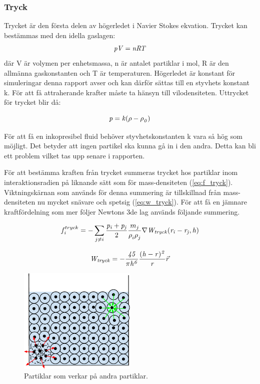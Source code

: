 \documentclass[a4paper,12pt,oneside,final]{extarticle}
\begin{document}
\subsubsection{Tryck}
Trycket är den första delen av högerledet i Navier Stokes ekvation.
Trycket kan bestämmas med den idella gaslagen:
\begin{equation}
{\it pV = nRT}
\end{equation}
där V är volymen per enhetsmassa, n är antalet partiklar i mol, R är den allmänna gaskonstanten och T är temperaturen.
Högerledet är konstant för simuleringar denna rapport avser och kan därför sättas till en styvhets konstant k. 
För att få attraherande krafter måste ta hänsyn till vilodensiteten. Uttrycket för trycket blir då:

\begin{equation}
{\it p = k(\rho - \rho^{}_{0})}
\end{equation}


För att få en inkopresibel fluid behöver styvhetskonstanten k vara så hög som möjligt. Det betyder att ingen partikel ska kunna gå in i den andra. Detta kan bli ett problem vilket tas upp senare i rapporten.

För att bestämma kraften från trycket summeras trycket hos partiklar inom interaktionsradien på liknande sätt som för mass-densiteten (\ref{eq:f_tryck}).
Viktningskärnan som används för denna summering är tillskillnad från mass-densiteten nu mycket snävare och spetsig (\ref{eq:w_tryck}).
För att få en jämnare kraftfördelning som mer följer Newtons 3de lag används följande summering.

\begin{equation} \label{eq:f_tryck}
f^{tryck}_i = - \sum_{j \neq i} \frac{\it p_i + p_j}{2} \frac{m_j}{\rho^{}_{i} \rho^{}_{j}} \nabla {\it W_{tryck} (r_i - r_j,h)}
\end{equation}

\begin{equation} \label{eq:w_tryck}
{\it W_{tryck} = -\frac{45}{\pi h^6}\frac{(h-r)^2}{r}} \vec{r}
\end{equation}


\begin{figure}[H]
  \centering
    \includegraphics[width=0.5\textwidth]{bilder/partiklar_komprimering}
  \caption{Partiklar som verkar på andra partiklar.}
\end{figure}
\end{document}
